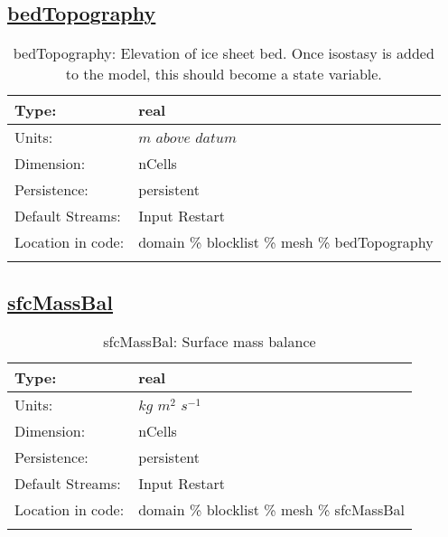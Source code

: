 \subsection[bedTopography]{\hyperref[sec:var_tab_mesh]{bedTopography}}
\label{subsec:var_sec_mesh_bedTopography}
\begin{center}
\begin{longtable}{| p{2.0in} | p{4.0in} |}
        \hline 
        Type: & real \\
        \hline 
        Units: & $m$ $above$ $datum$ \\
        \hline 
        Dimension: & nCells \\
        \hline 
        Persistence: & persistent \\
        \hline 
		 Default Streams: & Input Restart  \\
        \hline 
		 Location in code: & domain \% blocklist \% mesh \% bedTopography \\
		 \hline 
    \caption{bedTopography: Elevation of ice sheet bed.  Once isostasy is added to the model, this should become a state variable.}
\end{longtable}
\end{center}
\subsection[sfcMassBal]{\hyperref[sec:var_tab_mesh]{sfcMassBal}}
\label{subsec:var_sec_mesh_sfcMassBal}
\begin{center}
\begin{longtable}{| p{2.0in} | p{4.0in} |}
        \hline 
        Type: & real \\
        \hline 
        Units: & $kg$ $m^2$ $s^{-1}$ \\
        \hline 
        Dimension: & nCells \\
        \hline 
        Persistence: & persistent \\
        \hline 
		 Default Streams: & Input Restart  \\
        \hline 
		 Location in code: & domain \% blocklist \% mesh \% sfcMassBal \\
		 \hline 
    \caption{sfcMassBal: Surface mass balance}
\end{longtable}
\end{center}
